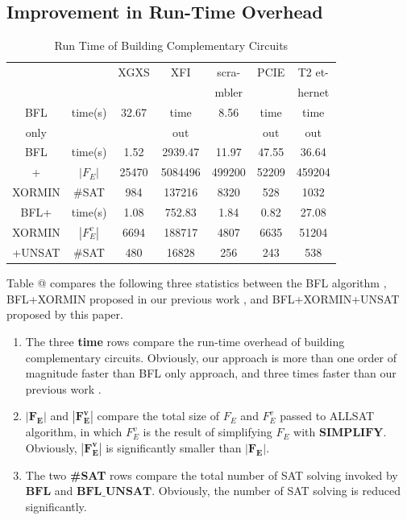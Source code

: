 \documentclass[journal]{IEEEtran}
\makeatletter
\newcommand{\Rmnum}[1]{\expandafter\@slowromancap\romannumeral #1@}
\makeatother
\begin{document}
\subsection{Improvement in Run-Time Overhead}
\begin{table}[!t]
\centering
\caption{Run Time of Building Complementary Circuits}
\begin{tabular}{|c|c|c|c|c|c|c|}
\hline
            &&XGXS&XFI& scra-   &PCIE&T2 et-	  \\
            &&       &      & mbler&    &  hernet      	  \\ \hline
BFL    &time(s)&32.67   &time&8.56&time&time 		     \\
only&&&out&&out&out 		     \\ \hline
BFL    &time(s)&1.52   &2939.47&11.97     &47.55&36.64 		     \\ \cline{2-7}
+   &$|F_E|$&25470&5084496&499200&52209&459204\\ \cline{2-7}
XORMIN      &\#SAT&984&137216&8320&528&1032        	  \\ \hline
BFL+     &time(s)&1.08   &752.83 &1.84      &0.82& 27.08       	  \\ \cline{2-7}
XORMIN     &$|F_E^v|$&6694&188717&4807&6635&51204\\ \cline{2-7}
+UNSAT       &\#SAT&480&16828&256&243&538        	  \\ \hline
\end{tabular}
\end{table}
Table \Rmnum{3} compares the following three statistics between the BFL algorithm \cite{MINASS},
BFL+XORMIN proposed in our previous work \cite{ShegnYuShen:iccad09},
and BFL+XORMIN+UNSAT proposed by this paper.
\begin{enumerate}
\item The three \textbf{time} rows compare the run-time overhead of building complementary circuits.
Obviously,
our approach is more than one order of magnitude faster than BFL only approach,
and three times faster than our previous work \cite{ShegnYuShen:iccad09}.
\item $\boldsymbol{|F_E|}$ and $\boldsymbol{|F_E^v|}$ compare the total size of $F_E$ and $F_E^v$ passed to ALLSAT algorithm,
in which $F_E^v$ is the result of simplifying $F_E$ with $\boldsymbol{SIMPLIFY}$.
Obviously,
$\boldsymbol{|F_E^v|}$ is significantly smaller than $\boldsymbol{|F_E|}$.
\item The two \textbf{\#SAT} rows compare the total number of SAT solving invoked by $\boldsymbol{BFL}$ and $\boldsymbol{BFL\_UNSAT}$.
Obviously,
the number of SAT solving is reduced significantly.
\end{enumerate}
\end{document}
